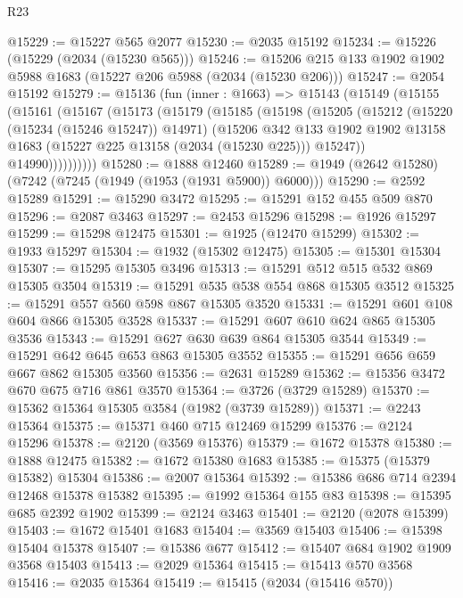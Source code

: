 \begin{lexlean}{R23}
\begin{coremodule}
@15229 := @15227 @565 @2077
@15230 := @2035 @15192
@15234 := @15226 (@15229 (@2034 (@15230 @565)))
@15246 := @15206 @215 @133 @1902 @1902 @5988 @1683 (@15227 @206 @5988 (@2034 (@15230 @206)))
@15247 := @2054 @15192
@15279 := @15136
    (fun (inner : @1663) =>
    @15143
      (@15149
        (@15155
          (@15161
            (@15167
              (@15173
                (@15179
                  (@15185
                    (@15198
                      (@15205
                        (@15212
                          (@15220 (@15234 (@15246 @15247)) @14971)
                          (@15206
                            @342
                            @133
                            @1902
                            @1902
                            @13158
                            @1683
                            (@15227 @225 @13158 (@2034 (@15230 @225)))
                            @15247))
                        @14990))))))))))
@15280 := @1888 @12460
@15289 := @1949 (@2642 @15280) (@7242 (@7245 (@1949 (@1953 (@1931 @5900)) @6000)))
@15290 := @2592 @15289
@15291 := @15290 @3472
@15295 := @15291 @152 @455 @509 @870
@15296 := @2087 @3463
@15297 := @2453 @15296
@15298 := @1926 @15297
@15299 := @15298 @12475
@15301 := @1925 (@12470 @15299)
@15302 := @1933 @15297
@15304 := @1932 (@15302 @12475)
@15305 := @15301 @15304
@15307 := @15295 @15305 @3496
@15313 := @15291 @512 @515 @532 @869 @15305 @3504
@15319 := @15291 @535 @538 @554 @868 @15305 @3512
@15325 := @15291 @557 @560 @598 @867 @15305 @3520
@15331 := @15291 @601 @108 @604 @866 @15305 @3528
@15337 := @15291 @607 @610 @624 @865 @15305 @3536
@15343 := @15291 @627 @630 @639 @864 @15305 @3544
@15349 := @15291 @642 @645 @653 @863 @15305 @3552
@15355 := @15291 @656 @659 @667 @862 @15305 @3560
@15356 := @2631 @15289
@15362 := @15356 @3472 @670 @675 @716 @861 @3570
@15364 := @3726 (@3729 @15289)
@15370 := @15362 @15364 @15305 @3584 (@1982 (@3739 @15289))
@15371 := @2243 @15364
@15375 := @15371 @460 @715 @12469 @15299
@15376 := @2124 @15296
@15378 := @2120 (@3569 @15376)
@15379 := @1672 @15378
@15380 := @1888 @12475
@15382 := @1672 @15380 @1683
@15385 := @15375 (@15379 @15382) @15304
@15386 := @2007 @15364
@15392 := @15386 @686 @714 @2394 @12468 @15378 @15382
@15395 := @1992 @15364 @155 @83
@15398 := @15395 @685 @2392 @1902
@15399 := @2124 @3463
@15401 := @2120 (@2078 @15399)
@15403 := @1672 @15401 @1683
@15404 := @3569 @15403
@15406 := @15398 @15404 @15378
@15407 := @15386 @677
@15412 := @15407 @684 @1902 @1909 @3568 @15403
@15413 := @2029 @15364
@15415 := @15413 @570 @3568
@15416 := @2035 @15364
@15419 := @15415 (@2034 (@15416 @570))

\end{coremodule}
\end{lexlean}
